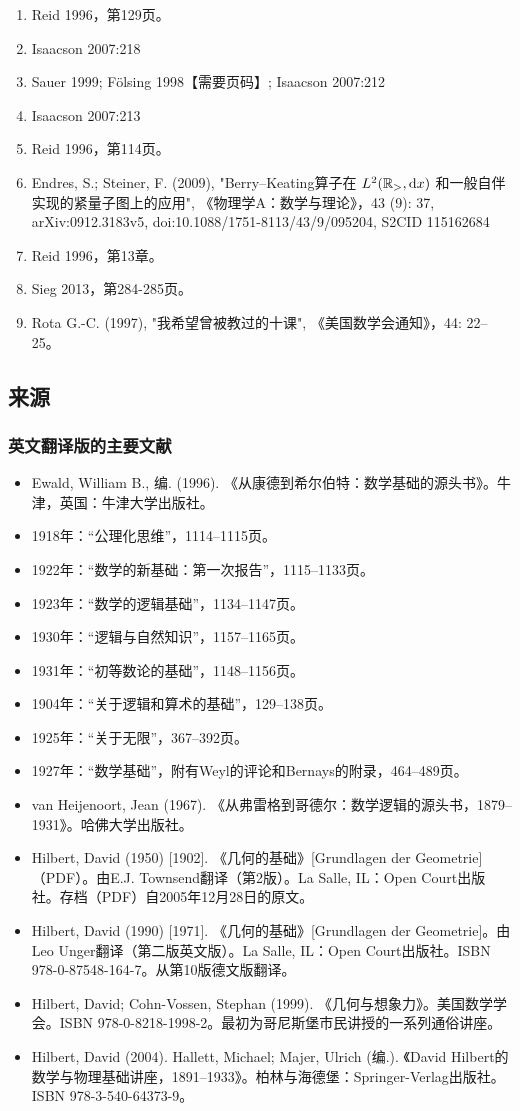 \begin{enumerate}
\item Reid 1996，第129页。
\item Isaacson 2007:218
\item Sauer 1999; Fölsing 1998【需要页码】; Isaacson 2007:212
\item Isaacson 2007:213
\item Reid 1996，第114页。
\item Endres, S.; Steiner, F. (2009), "Berry–Keating算子在 \( L^{2}({\mathbb{R}}_{>},{\rm d}x) \) 和一般自伴实现的紧量子图上的应用", 《物理学A：数学与理论》，43 (9): 37, arXiv:0912.3183v5, doi:10.1088/1751-8113/43/9/095204, S2CID 115162684
\item Reid 1996，第13章。
\item Sieg 2013，第284-285页。
\item Rota G.-C. (1997), "我希望曾被教过的十课", 《美国数学会通知》，44: 22–25。
\end{enumerate}
\subsection{来源}
\subsubsection{英文翻译版的主要文献}
\begin{itemize}
\item Ewald, William B., 编. (1996). 《从康德到希尔伯特：数学基础的源头书》。牛津，英国：牛津大学出版社。
  \item 1918年：“公理化思维”，1114–1115页。
  \item 1922年：“数学的新基础：第一次报告”，1115–1133页。
  \item 1923年：“数学的逻辑基础”，1134–1147页。
  \item 1930年：“逻辑与自然知识”，1157–1165页。
  \item 1931年：“初等数论的基础”，1148–1156页。
  \item 1904年：“关于逻辑和算术的基础”，129–138页。
  \item 1925年：“关于无限”，367–392页。
  \item 1927年：“数学基础”，附有Weyl的评论和Bernays的附录，464–489页。
\item van Heijenoort, Jean (1967). 《从弗雷格到哥德尔：数学逻辑的源头书，1879–1931》。哈佛大学出版社。
\item Hilbert, David (1950) [1902]. 《几何的基础》[Grundlagen der Geometrie]（PDF）。由E.J. Townsend翻译（第2版）。La Salle, IL：Open Court出版社。存档（PDF）自2005年12月28日的原文。
\item Hilbert, David (1990) [1971]. 《几何的基础》[Grundlagen der Geometrie]。由Leo Unger翻译（第二版英文版）。La Salle, IL：Open Court出版社。ISBN 978-0-87548-164-7。从第10版德文版翻译。
\item Hilbert, David; Cohn-Vossen, Stephan (1999). 《几何与想象力》。美国数学学会。ISBN 978-0-8218-1998-2。最初为哥尼斯堡市民讲授的一系列通俗讲座。
\item Hilbert, David (2004). Hallett, Michael; Majer, Ulrich (编.). 《David Hilbert的数学与物理基础讲座，1891–1933》。柏林与海德堡：Springer-Verlag出版社。ISBN 978-3-540-64373-9。
\end{itemize}
